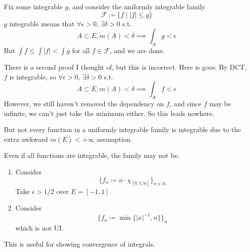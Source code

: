   \begin{example}
    Fix some integrable $g$, and consider the uniformly integrable family 
    \begin{equation}
      \mathscr{F} \coloneqq \{ f \mid |f| \leq g \}
    \end{equation}
    $g$ integrable means that $\forall \epsilon > 0$, $\exists \delta > 0$ s.t. 
    \begin{equation}
      A \subset E, m(A) < \delta \implies \int_A g < \epsilon
    \end{equation}
    But $\int f \leq \int |f| < \int g$ for all $f \in \mathscr{F}$, and we are done.   

    There is a second proof I thought of, but this is incorrect. Here is goes: By DCT, $f$ is integrable, so $\forall \epsilon > 0$, $\exists \delta > 0$ s.t. 
    \begin{equation}
      A \subset E, m(A) < \delta \implies \int_A f < \epsilon
    \end{equation}
    However, we still haven't removed the dependency on $f$, and since $f$ may be infinite, we can't just take the minimum either. So this leads nowhere. 
  \end{example}

  But not every function in a uniformly integrable family is integrable due to the extra awkward $m(E) < +\infty$ assumption.  

  \begin{example}
    Even if all functions are integrable, the family may not be. 
    \begin{enumerate}
      \item Consider 
      \begin{equation}
        \{f_n \coloneqq n \cdot \chi_{[0, 1/n]}\}_{n \in \mathbb{N}} 
      \end{equation}
      Take $\epsilon > 1/2$ over $E = [-1, 1]$. 

      \item Consider 
      \begin{equation}
        \{f_n \coloneqq \min\{|x|^{-1}, n\} \}_n
      \end{equation}
      which is not UI. 
    \end{enumerate}
  \end{example}

  This is useful for showing convergence of integrals. 

